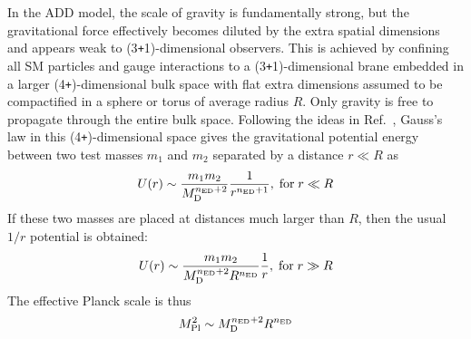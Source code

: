 In the ADD model, the scale of gravity is fundamentally strong, but the gravitational force effectively becomes diluted by the extra spatial dimensions and appears weak to (3\texttt{+}1)-dimensional observers. This is achieved by confining all SM particles and gauge interactions to a (3\texttt{+}1)-dimensional brane embedded in a larger (4\texttt{+}{\nED})-dimensional bulk space with \nED flat extra dimensions assumed to be compactified in a sphere or torus of average radius $R$. Only gravity is free to propagate through the entire bulk space. Following the ideas in Ref.~\cite{ArkaniHamed:1998rs}, Gauss's law in this (4\texttt{+}{\nED})-dimensional space gives the gravitational potential energy between two test masses $m_1$ and $m_2$ separated by a distance $r \ll R$ as
\begin{equation}
	U(r) \sim \frac{m_1m_2}{M_\textrm{D}^{n_{\rm ED}+2}}\frac{1}{r^{n_{\rm ED}+1}}, \; \text{for} \; r \ll R
\end{equation}
If these two masses are placed at distances much larger than $R$, then the usual $1/r$ potential is obtained:
\begin{equation}
	U(r) \sim \frac{m_1m_2}{M_\textrm{D}^{n_{\rm ED}+2}R^{n_{\rm ED}}}\frac{1}{r}, \; \text{for} \; r \gg R
\end{equation}
The effective Planck scale \Mpl is thus
\begin{equation}\label{ADD_size}
	M_{\textrm{Pl}}^2 \sim M_\textrm{D}^{n_{\rm ED}+2}R^{n_{\rm ED}}
\end{equation}

